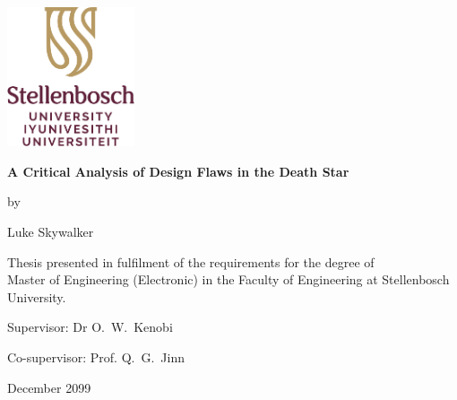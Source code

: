 \graphicspath{{frontmatter/fig/}}

\begin{titlepage}
	\begin{center}
		
        \includegraphics[width=3.75cm]{SU_corporate_vertical_without_slogan_RGB-crop}
				
		\vfill
		
		{\sffamily \bfseries \huge A Critical Analysis of Design Flaws in the Death Star \par}
		
		\vfill
		
        {\large by \\[5pt]}
		{\large {\Large Luke Skywalker} \par}
		
		\vfill
		
		\vfill
		
		
		{\large Thesis presented in fulfilment of the requirements for the degree of \\ Master of Engineering (Electronic) in the Faculty of Engineering at Stellenbosch University. \par}
		
		
		
		\vfill
		
		{\large {Supervisor}: Dr O.\ W.\ Kenobi}\par
        {\large {Co-supervisor}: Prof. Q.\ G.\ Jinn}
		
		\vfill
		
		{\Large December 2099}
	\end{center}
\end{titlepage}
